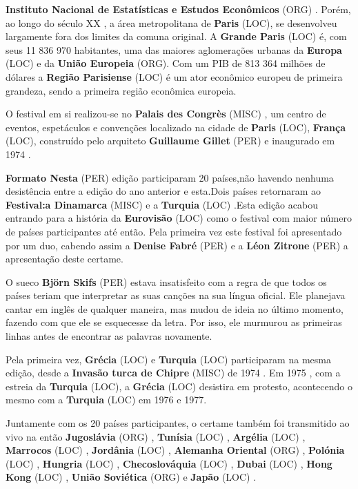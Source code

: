 \documentclass[12pt,a4paper]{article}
\begin{document}
\textbf{Instituto Nacional de Estatísticas e Estudos Econômicos} (ORG) . Porém, ao longo do século XX , a área metropolitana de \textbf{Paris} (LOC), se desenvolveu largamente fora dos limites da comuna original. A \textbf{Grande Paris} (LOC) é, com seus 11 836 970 habitantes, uma das maiores aglomerações urbanas da \textbf{Europa} (LOC) e da \textbf{União Europeia} (ORG). Com um PIB de 813 364 milhões de dólares a \textbf{Região Parisiense} (LOC) é um ator econômico europeu de primeira grandeza, sendo a primeira região econômica europeia.

O festival em si realizou-se no \textbf{Palais des Congrès} (MISC) , um centro de eventos, espetáculos e convenções localizado na cidade de \textbf{Paris} (LOC), \textbf{França} (LOC), construído pelo arquiteto \textbf{Guillaume Gillet} (PER) e inaugurado em 1974 .



\textbf{Formato Nesta} (PER) edição participaram 20 países,não havendo nenhuma desistência entre a edição do ano anterior e esta.Dois países retornaram ao \textbf{Festival:a Dinamarca} (MISC) e a \textbf{Turquia} (LOC) .Esta edição acabou entrando para a história da \textbf{Eurovisão} (LOC) como o festival com maior número de países participantes até então. Pela primeira vez este festival foi apresentado por um duo, cabendo assim a \textbf{Denise Fabré} (PER) e a \textbf{Léon Zitrone} (PER) a apresentação deste certame.

O sueco \textbf{Björn Skifs} (PER) estava insatisfeito com a regra de que todos os países teriam que interpretar as suas canções na sua língua oficial. Ele planejava cantar em inglês de qualquer maneira, mas mudou de ideia no último momento, fazendo com que ele se esquecesse da letra. Por isso, ele murmurou as primeiras linhas antes de encontrar as palavras novamente.

Pela primeira vez, \textbf{Grécia} (LOC) e \textbf{Turquia} (LOC) participaram na mesma edição, desde a \textbf{Invasão turca de Chipre} (MISC) de 1974 . Em 1975 , com a estreia da \textbf{Turquia} (LOC), a \textbf{Grécia} (LOC) desistira em protesto, acontecendo o mesmo com a \textbf{Turquia} (LOC) em 1976 e 1977.

Juntamente com os 20 países participantes, o certame também foi transmitido ao vivo na então \textbf{Jugoslávia} (ORG) , \textbf{Tunísia} (LOC) , \textbf{Argélia} (LOC) , \textbf{Marrocos} (LOC) , \textbf{Jordânia} (LOC) , \textbf{Alemanha Oriental} (ORG) , \textbf{Polónia} (LOC) , \textbf{Hungria} (LOC) , \textbf{Checoslováquia} (LOC) , \textbf{Dubai} (LOC) , \textbf{Hong Kong} (LOC) , \textbf{União Soviética} (ORG) e \textbf{Japão} (LOC) .
\end{document}

